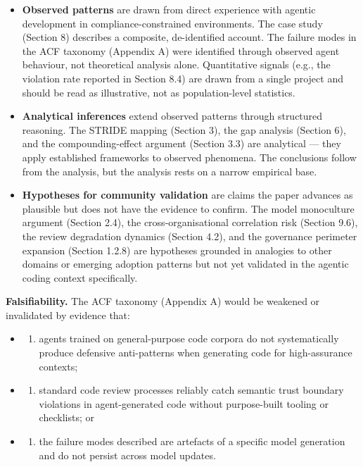 \documentclass[a4paper,11pt]{report}
\providecommand{\tightlist}{%
  \setlength{\itemsep}{0pt}\setlength{\parskip}{0pt}}
\begin{document}
\begin{itemize}
\item
  \textbf{Observed patterns} are drawn from direct experience with
  agentic development in compliance-constrained environments. The case
  study (Section 8) describes a composite, de-identified account. The
  failure modes in the ACF taxonomy (Appendix A) were identified through
  observed agent behaviour, not theoretical analysis alone. Quantitative
  signals (e.g., the violation rate reported in Section 8.4) are drawn
  from a single project and should be read as illustrative, not as
  population-level statistics.
\item
  \textbf{Analytical inferences} extend observed patterns through
  structured reasoning. The STRIDE mapping (Section 3), the gap analysis
  (Section 6), and the compounding-effect argument (Section 3.3) are
  analytical --- they apply established frameworks to observed
  phenomena. The conclusions follow from the analysis, but the analysis
  rests on a narrow empirical base.
\item
  \textbf{Hypotheses for community validation} are claims the paper
  advances as plausible but does not have the evidence to confirm. The
  model monoculture argument (Section 2.4), the cross-organisational
  correlation risk (Section 9.6), the review degradation dynamics
  (Section 4.2), and the governance perimeter expansion (Section 1.2.8)
  are hypotheses grounded in analogies to other domains or emerging
  adoption patterns but not yet validated in the agentic coding context
  specifically.
\end{itemize}

\textbf{Falsifiability.} The ACF taxonomy (Appendix A) would be weakened
or invalidated by evidence that:

\begin{itemize}
\item
  \begin{enumerate}
  \def\labelenumi{(\alph{enumi})}
  \tightlist
  \item
    agents trained on general-purpose code corpora do not systematically
    produce defensive anti-patterns when generating code for
    high-assurance contexts;
  \end{enumerate}
\item
  \begin{enumerate}
  \def\labelenumi{(\alph{enumi})}
  \setcounter{enumi}{1}
  \tightlist
  \item
    standard code review processes reliably catch semantic trust
    boundary violations in agent-generated code without purpose-built
    tooling or checklists; or
  \end{enumerate}
\item
  \begin{enumerate}
  \def\labelenumi{(\alph{enumi})}
  \setcounter{enumi}{2}
  \tightlist
  \item
    the failure modes described are artefacts of a specific model
    generation and do not persist across model updates.
  \end{enumerate}
\end{itemize}
\end{document}
